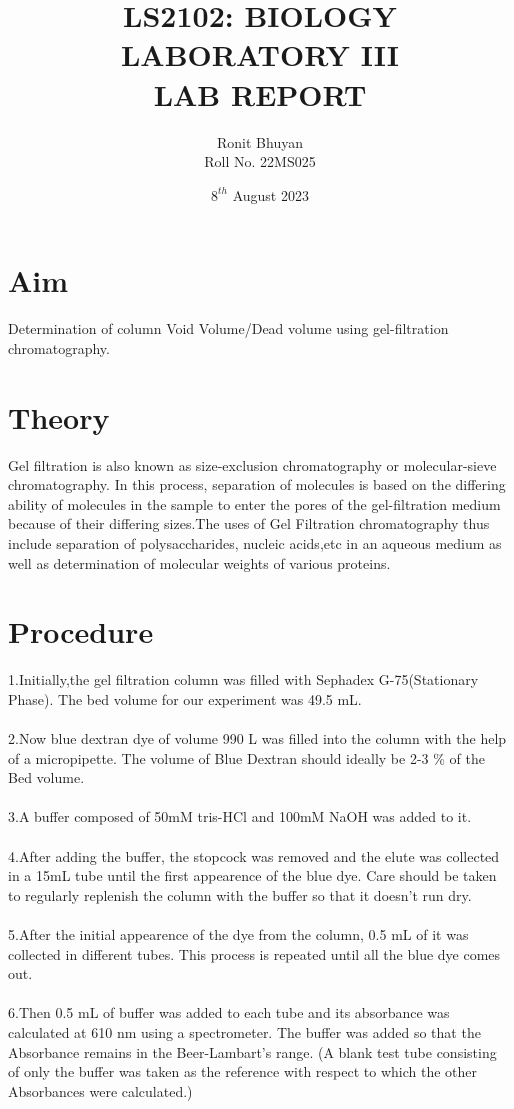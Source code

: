 \documentclass[12pt]{article}
\theoremstyle{definition}
\theoremstyle{definition}
\theoremstyle{remark}
\begin{document}
\title{LS2102: BIOLOGY LABORATORY III\\[2ex] LAB REPORT}
\author{Ronit Bhuyan \\Roll No. 22MS025}
\date{$8^{th}$ August 2023}

\maketitle

\section*{Aim}
Determination of column Void Volume/Dead volume using gel-filtration chromatography.

\section*{Theory}
Gel filtration is also known as size-exclusion chromatography or molecular-sieve chromatography. In this process, separation of molecules is based on the differing ability of molecules in the sample to enter the pores of the gel-filtration medium because of their differing sizes.The uses of Gel Filtration chromatography thus include separation of polysaccharides, nucleic acids,etc in an aqueous medium as well as determination of molecular weights of various proteins.



\section*{Procedure}
1.Initially,the gel filtration column was filled with Sephadex G-75(Stationary Phase). The bed volume for our experiment was 49.5 mL.\\
\\
2.Now blue dextran dye of volume 990 \textmu L was filled into the column with the help of a micropipette. The volume of Blue Dextran should ideally be 2-3 \% of the Bed volume.\\
\\
3.A buffer composed of 50mM tris-HCl and 100mM NaOH was added to it.\\
\\
4.After adding the buffer, the stopcock was removed and the elute was collected in a 15mL tube until the first appearence of the blue dye. Care should be taken to regularly replenish the column with the buffer so that it doesn't run dry. \\
\\
5.After the initial appearence of the dye from the column, 0.5 mL of it was collected in different tubes. This process is repeated until all the blue dye comes out.\\
\\
6.Then 0.5 mL  of buffer was added to each tube and its absorbance was calculated at 610 nm using a spectrometer. The buffer was added so that the Absorbance remains in the Beer-Lambart's range.
(A blank test tube consisting of only the buffer was taken as the reference with respect to which the other Absorbances were calculated.)\\
\end{document}

